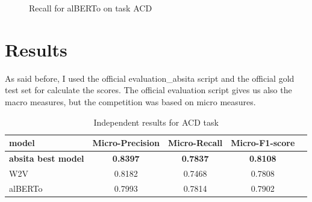 \documentclass{article}
\begin{document}
\begin{figure}[!htb]
\begin{minipage}{0.48\textwidth}
                    \caption{Recall for alBERTo on task ACD}\label{Fig:Data12}
                \end{minipage}
            \end{figure}

    \section{Results}\label{sec:s5}
        As said before, I used the official evaluation\_absita script and the official gold test set for calculate the scores.
        The official evaluation script gives us also the macro measures, but the competition was based on micro measures.
                \begin{table}[h!]
                    \begin{center}
                        \caption{Independent results for ACD task}
                        \label{tab:table2}
                        \begin{tabular}{l|c|c|c|r}
                            \textbf{model} & \textbf{Micro-Precision} & \textbf{Micro-Recall} & \textbf{Micro-F1-score}\\
                            \hline
                                \textbf{absita best model} & \textbf{0.8397} & \textbf{0.7837} & \textbf{0.8108}\\
                                W2V & 0.8182 & 0.7468 & 0.7808\\
                                alBERTo & 0.7993 & 0.7814 & 0.7902\\
                        \end{tabular}
                    \end{center}
                \end{table}
\end{document}
